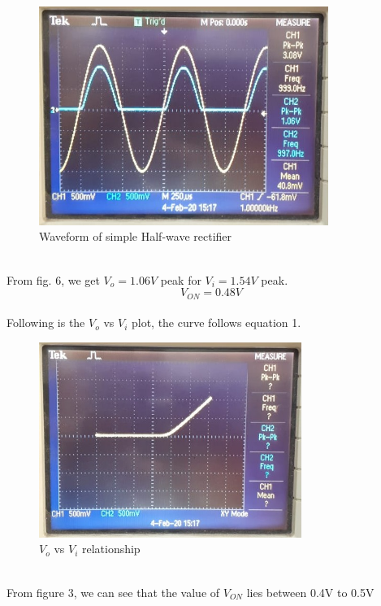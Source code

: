 \documentclass[12pt]{article}
\begin{document}
        \begin{figure}[H]
            \centering
            \includegraphics[width = 0.6\linewidth, height = 2.8in]{reports/lab3/vdon-waveform.jpeg}
            \caption{Waveform of simple Half-wave rectifier}
        \end{figure}
        \\
        From fig. 6, we get $V_o = 1.06 V$ peak for $V_i = 1.54 V$ peak.
        \begin{equation}
           \boxed{V_{ON} = 0.48V}   
        \end{equation}
        \\
        Following is the $V_o$ vs $V_i$ plot, the curve follows equation 1.
        \begin{figure}[H]
            \centering
            \includegraphics[width = 0.6\linewidth, height = 2.5in]{reports/lab3/vdon.jpeg}
            \caption{$V_o$ vs $V_i$ relationship}
        \end{figure}
        \\
        From figure 3, we can see that the value of $V_{ON}$ lies between 0.4V to 0.5V
        
\end{document}
